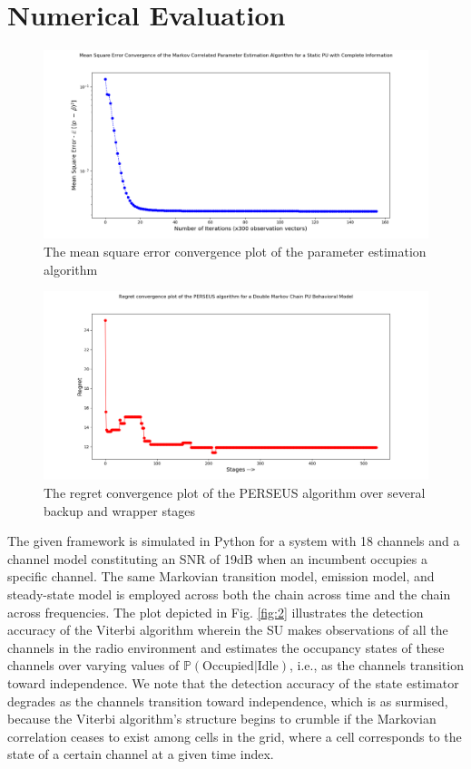 \documentclass[10pt,twocolumn]{IEEEtran}
\newcommand{\nm}[1]{}
\begin{document}
\section{Numerical Evaluation}\label{IV}
\begin{figure}
    \centering
    \includegraphics[scale=0.25]{Mean_Square_Plot_Log_Scale.png}
    \caption{The mean square error convergence plot of the parameter estimation algorithm\nm{Show x axis up to 40}}
    \label{fig:5}
\end{figure}
\begin{figure}
    \centering
    \includegraphics[scale=0.25]{Regret_Convergence_Plot_04112019.png}
    \caption{The regret convergence plot of the PERSEUS algorithm over several backup and wrapper stages}
    \label{fig:6}
\end{figure}
The given framework is simulated in Python for a system with 18 channels and a channel model constituting an SNR of 19dB when an incumbent occupies a specific channel. The same Markovian transition model, emission model, and steady-state model is employed across both the chain across time and the chain across frequencies. The plot depicted in Fig. \ref{fig:2} illustrates the detection accuracy of the Viterbi algorithm wherein the SU makes observations of all the channels in the radio environment and estimates the occupancy states of these channels over varying values of $\mathbb{P}(\text{Occupied}|\text{Idle})$, i.e., as the channels transition toward independence. We note that the detection accuracy of the state estimator degrades as the channels transition toward independence, which is as surmised, because the Viterbi algorithm's structure begins to crumble if the Markovian correlation ceases to exist among cells in the grid, where a cell corresponds to the state of a certain channel at a given time index.
\end{document}
